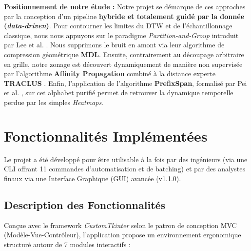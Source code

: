 \documentclass[11pt, a4paper]{article}
\begin{document}
\textbf{Positionnement de notre étude :} 
Notre projet se démarque de ces approches par la conception d'un pipeline \textbf{hybride et totalement guidé par la donnée (\textit{data-driven})}. 
Pour contourner les limites du DTW et de l'échantillonnage classique, nous nous appuyons sur le paradigme \textit{Partition-and-Group} introduit par Lee et al. \cite{lee2007}. Nous supprimons le bruit en amont via leur algorithme de compression géométrique \textbf{MDL}. Ensuite, contrairement au découpage arbitraire en grille, notre zonage est découvert dynamiquement de manière non supervisée par l'algorithme \textbf{Affinity Propagation} combiné à la distance experte \textbf{TRACLUS} \cite{lee2007}. Enfin, l'application de l'algorithme \textbf{PrefixSpan}, formalisé par Pei et al. \cite{pei2001}, sur cet alphabet purifié permet de retrouver la dynamique temporelle perdue par les simples \textit{Heatmaps}.

\section{Fonctionnalités Implémentées}

Le projet a été développé pour être utilisable à la fois par des ingénieurs (via une CLI offrant 11 commandes d'automatisation et de batching) et par des analystes finaux via une Interface Graphique (GUI) avancée (v1.1.0).

\subsection{Description des Fonctionnalités}

Conçue avec le framework \textit{CustomTkinter} selon le patron de conception MVC (Modèle-Vue-Contrôleur), l'application propose un environnement ergonomique structuré autour de 7 modules interactifs :
\end{document}
